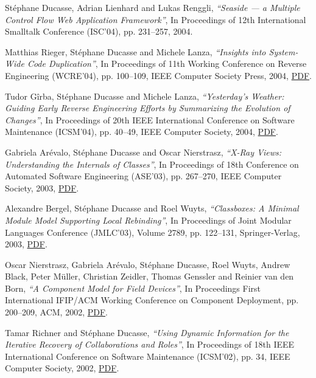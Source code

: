 \documentclass{article}
\newcommand{\czauthors}[1]{#1}
\newcommand{\cztitle}[1]{\emph{``#1''}}
\newcommand{\czbooktitle}[1]{#1}
\begin{document}
\begin{itemize}
	\pub  \czauthors{St\'ephane Ducasse, Adrian Lienhard and Lukas Renggli},  \cztitle{Seaside --- a Multiple Control Flow Web Application Framework},  In \czbooktitle{Proceedings of 12th International Smalltalk Conference (ISC'04)}, pp. 231--257, 2004.

	\pub  \czauthors{Matthias Rieger, St\'ephane Ducasse and Michele Lanza},  \cztitle{Insights into System-Wide Code Duplication},  In \czbooktitle{Proceedings of 11th Working Conference on Reverse Engineering (WCRE'04)}, pp. 100--109, IEEE Computer Society Press, 2004, \href{http://rmod-files.lille.inria.fr/Team/Texts/Papers/Rieg04bWCRE2004ClonesVisualization.pdf}{PDF}.

	\pub  \czauthors{Tudor G\^irba, St\'ephane Ducasse and Michele Lanza},  \cztitle{{Yesterday's} {Weather}: Guiding Early Reverse Engineering Efforts by Summarizing the Evolution of Changes},  In \czbooktitle{Proceedings of 20th IEEE International Conference on Software Maintenance (ICSM'04)}, pp. 40--49, IEEE Computer Society, 2004, \href{http://rmod-files.lille.inria.fr/Team/Texts/Papers/Girb04b-ICSM04-YesterdayWeather.pdf}{PDF}.

	\pub  \czauthors{Gabriela Ar{\'e}valo, St\'ephane Ducasse and Oscar Nierstrasz},  \cztitle{{X-Ray} Views: Understanding the Internals of Classes},  In \czbooktitle{Proceedings of 18th Conference on Automated Software Engineering (ASE'03)}, pp. 267--270, IEEE Computer Society, 2003, \href{http://rmod-files.lille.inria.fr/Team/Texts/Papers/Arev03c-ASE03-XRayViews.pdf}{PDF}.

	\pub  \czauthors{Alexandre Bergel, St\'ephane Ducasse and Roel Wuyts},  \cztitle{Classboxes: A Minimal Module Model Supporting Local Rebinding},  In \czbooktitle{Proceedings of Joint Modular Languages Conference (JMLC'03)}, Volume 2789, pp. 122--131, Springer-Verlag, 2003, \href{http://rmod-files.lille.inria.fr/Team/Texts/Papers/Berg03a-JMLC03-Classboxes.pdf}{PDF}.

	\pub  \czauthors{Oscar Nierstrasz, Gabriela Ar{\'e}valo, St\'ephane Ducasse, Roel Wuyts, Andrew Black, Peter M{\"u}ller, Christian Zeidler, Thomas Genssler and Reinier van den Born},  \cztitle{A Component Model for Field Devices},  In \czbooktitle{Proceedings First International IFIP/ACM Working Conference on Component Deployment}, pp. 200--209, ACM, 2002, \href{http://rmod-files.lille.inria.fr/Team/Texts/Papers/Nier02aPecosModel.pdf}{PDF}.

	\pub  \czauthors{Tamar Richner and St\'ephane Ducasse},  \cztitle{Using Dynamic Information for the Iterative Recovery of Collaborations and Roles},  In \czbooktitle{Proceedings of 18th IEEE International Conference on Software Maintenance (ICSM'02)}, pp. 34, IEEE Computer Society, 2002, \href{http://rmod-files.lille.inria.fr/Team/Texts/Papers/Rich02aRolesExtractionICSM2002.pdf}{PDF}.


\end{itemize}
\end{document}
